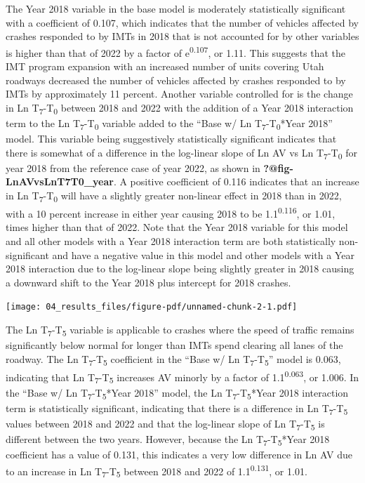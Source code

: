 \documentclass[
  letterpaper,
  authoryear]{elsarticle}
\begin{document}
The Year 2018 variable in the base model is moderately statistically
significant with a coefficient of 0.107, which indicates that the number
of vehicles affected by crashes responded to by IMTs in 2018 that is not
accounted for by other variables is higher than that of 2022 by a factor
of e\textsuperscript{0.107}, or 1.11. This suggests that the IMT program
expansion with an increased number of units covering Utah roadways
decreased the number of vehicles affected by crashes responded to by
IMTs by approximately 11 percent. Another variable controlled for is the
change in Ln T\textsubscript{7}-T\textsubscript{0} between 2018 and 2022
with the addition of a Year 2018 interaction term to the Ln
T\textsubscript{7}-T\textsubscript{0} variable added to the ``Base w/ Ln
T\textsubscript{7}-T\textsubscript{0}*Year 2018'' model. This variable
being suggestively statistically significant indicates that there is
somewhat of a difference in the log-linear slope of Ln AV vs Ln
T\textsubscript{7}-T\textsubscript{0} for year 2018 from the reference
case of year 2022, as shown in \textbf{?@fig-LnAVvsLnT7T0\_year}. A
positive coefficient of 0.116 indicates that an increase in Ln
T\textsubscript{7}-T\textsubscript{0} will have a slightly greater
non-linear effect in 2018 than in 2022, with a 10 percent increase in
either year causing 2018 to be 1.1\textsuperscript{0.116}, or 1.01,
times higher than that of 2022. Note that the Year 2018 variable for
this model and all other models with a Year 2018 interaction term are
both statistically non-significant and have a negative value in this
model and other models with a Year 2018 interaction due to the
log-linear slope being slightly greater in 2018 causing a downward shift
to the Year 2018 plus intercept for 2018 crashes.

\texttt{[image: 04\_results\_files/figure-pdf/unnamed-chunk-2-1.pdf]}

The Ln T\textsubscript{7}-T\textsubscript{5} variable is applicable to
crashes where the speed of traffic remains significantly below normal
for longer than IMTs spend clearing all lanes of the roadway. The Ln
T\textsubscript{7}-T\textsubscript{5} coefficient in the ``Base w/ Ln
T\textsubscript{7}-T\textsubscript{5}'' model is 0.063, indicating that
Ln T\textsubscript{7}-T\textsubscript{5} increases AV minorly by a
factor of 1.1\textsuperscript{0.063}, or 1.006. In the ``Base w/ Ln
T\textsubscript{7}-T\textsubscript{5}*Year 2018'' model, the Ln
T\textsubscript{7}-T\textsubscript{5}*Year 2018 interaction term is
statistically significant, indicating that there is a difference in Ln
T\textsubscript{7}-T\textsubscript{5} values between 2018 and 2022 and
that the log-linear slope of Ln T\textsubscript{7}-T\textsubscript{5} is
different between the two years. However, because the Ln
T\textsubscript{7}-T\textsubscript{5}*Year 2018 coefficient has a value
of 0.131, this indicates a very low difference in Ln AV due to an
increase in Ln T\textsubscript{7}-T\textsubscript{5} between 2018 and
2022 of 1.1\textsuperscript{0.131}, or 1.01.
\end{document}
